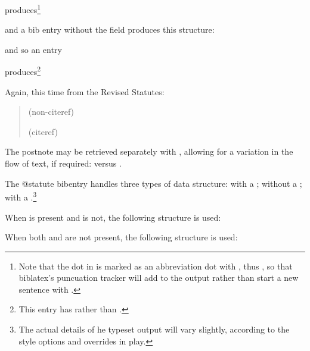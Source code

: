 produces\footnote{Note that the dot  in  is marked as an abbreviation dot with , thus , so that biblatex's puncuation tracker will add  to the output rather than start a new sentence with .}
\begin{quotation}
\end{quotation}
and a bib entry without the  field produces this structure:

\begin{quotation}
\end{quotation}
and so an entry

produces\footnote{This entry has  rather than .}
\begin{quotation}
\end{quotation}

\p Again, this time from the Revised Statutes:
\begin{quotation}
\noindent{} {\footnotesize (non-citeref)}

\noindent{} {\footnotesize (citeref)}
\end{quotation}

\p The postnote may be retrieved separately with , allowing for a variation in the flow of text, if required:  versus .

\p The @statute bibentry handles three types of data structure: with a ; without a ; with a .\footnote{The actual details of he typeset output will vary slightly, according to the style options and overrides in play.}

\p When  is present and  is not, the following structure is used:

\begin{quotation}
\end{quotation}

\p When both  and  are not present, the following structure is used:

\begin{quotation}
\end{quotation}


